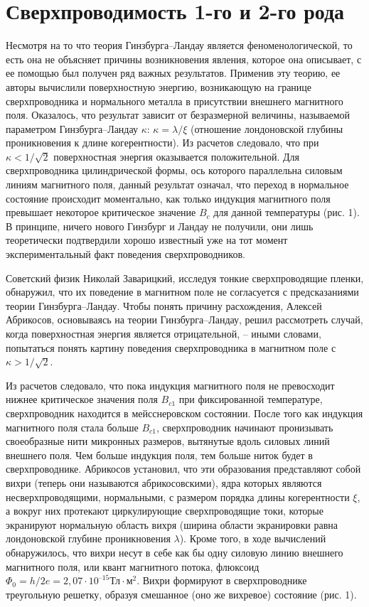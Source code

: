 \section{Сверхпроводимость 1-го и 2-го рода}

Несмотря на то что теория Гинзбурга–Ландау является феноменологической, то 
есть она не объясняет причины возникновения явления, которое она описывает, с 
ее помощью был получен ряд важных результатов. Применив эту теорию, ее авторы 
вычислили поверхностную энергию, возникающую на границе сверхпроводника и 
нормального металла в присутствии внешнего магнитного поля. Оказалось, что 
результат зависит от безразмерной величины, называемой параметром 
Гинзбурга–Ландау \( \kappa \): \( \kappa = \lambda/\xi \) (отношение 
лондоновской глубины проникновения к длине когерентности). Из расчетов 
следовало, что при \( \kappa < 1/\sqrt{2} \) поверхностная энергия оказывается 
положительной. Для сверхпроводника цилиндрической формы, ось которого 
параллельна силовым линиям магнитного поля, данный результат означал, что 
переход в нормальное состояние происходит моментально, как только индукция 
магнитного поля превышает некоторое критическое значение \( B_c \) для данной 
температуры (рис. 1). В принципе, ничего нового Гинзбург и Ландау не получили, 
они лишь теоретически подтвердили хорошо известный уже на тот момент 
экспериментальный факт поведения сверхпроводников.

Советский физик Николай Заварицкий, исследуя тонкие сверхпроводящие пленки, 
обнаружил, что их поведение в магнитном поле не согласуется с предсказаниями 
теории Гинзбурга–Ландау. Чтобы понять причину расхождения, Алексей Абрикосов, 
основываясь на теории Гинзбурга–Ландау, решил рассмотреть случай, когда 
поверхностная энергия является отрицательной, -- иными словами, попытаться 
понять картину поведения сверхпроводника в магнитном поле с 
\( \kappa > 1/\sqrt{2} \).

Из расчетов следовало, что пока индукция магнитного поля не превосходит нижнее 
критическое значения поля \( B_{c1} \) при фиксированной температуре, 
сверхпроводник находится в мейсснеровском состоянии. После того как индукция 
магнитного поля стала больше \( B_{c1} \), сверхпроводник начинают пронизывать 
своеобразные нити микронных размеров, вытянутые вдоль силовых линий внешнего 
поля. Чем больше индукция поля, тем больше ниток будет в сверхпроводнике. 
Абрикосов установил, что эти образования представляют собой вихри (теперь они 
называются абрикосовскими), ядра которых являются несверхпроводящими, 
нормальными, с размером порядка длины когерентности \( \xi \), а вокруг них 
протекают циркулирующие сверхпроводящие токи, которые экранируют нормальную 
область вихря (ширина области экранировки равна лондоновской глубине 
проникновения \( \lambda \)). Кроме того, в ходе вычислений обнаружилось, что 
вихри несут в себе как бы одну силовую линию внешнего магнитного поля, или 
квант магнитного потока, флюксоид 
\( \Phi_0 = h/2e = 2,07\cdot10^{–15} \text{Тл}\cdot{м}^2 \). Вихри формируют в 
сверхпроводнике треугольную решетку, образуя смешанное (оно же вихревое) 
состояние (рис. 1).

